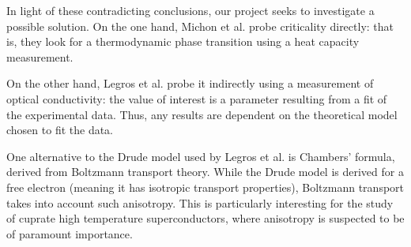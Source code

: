 In light of these contradicting conclusions, our project seeks to investigate a possible solution.
On the one hand, Michon et al. probe criticality directly: 
that is, they look for a thermodynamic phase transition using a heat capacity measurement.

On the other hand, Legros et al. probe it indirectly using a measurement of optical conductivity: 
the value of interest is a parameter resulting from a fit of the experimental data. 
Thus, any results are dependent on the theoretical model chosen to fit the data.

One alternative to the Drude model used by Legros et al. is Chambers' formula, 
derived from Boltzmann transport theory. 
While the Drude model is derived for a free electron 
(meaning it has isotropic transport properties), 
Boltzmann transport takes into account such anisotropy. 
This is particularly interesting for the study of cuprate high temperature superconductors, 
where anisotropy is suspected to be of paramount importance.

